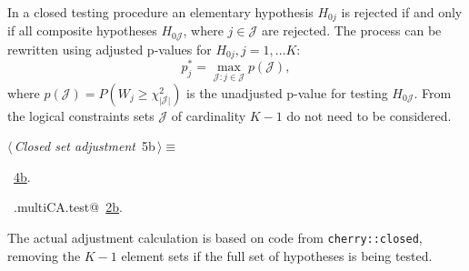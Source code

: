 \documentclass[reqno]{amsart}
\renewcommand{\NWtarget}[2]{\hypertarget{#1}{#2}}
\renewcommand{\NWlink}[2]{\hyperlink{#1}{#2}}
\newcommand{\setJ}{\mathcal{J}}
\begin{document}
In a closed testing procedure an elementary hypothesis $H_{0j}$ is rejected if and only if all composite hypotheses $H_{0\setJ}$, where $j\in \setJ$ are rejected. The process can be rewritten using adjusted p-values for $H_{0j}, j=1,\ldots K$:
\begin{equation}\label{E:adjustp}
    p^*_j = \max_{\setJ: j\in \setJ} p(\setJ),
\end{equation}
where $p(\setJ) = P(W_j \geq \chi^2_{|\setJ|})$ is the unadjusted p-value for testing $H_{0\setJ}$. From the logical constraints sets $\setJ$ of cardinality $K-1$ do not need to be considered.

\begin{flushleft} \small\label{scrap7}\raggedright\small
\NWtarget{nuweb5b}{} $\langle\,${\itshape Closed set adjustment}\nobreak\ {\footnotesize {5b}}$\,\rangle\equiv$
\vspace{-1ex}
\vspace{-1.5ex}
\footnotesize
\begin{list}{}{\setlength{\itemsep}{-\parsep}\setlength{\itemindent}{-\leftmargin}}
\item \NWtxtMacroRefIn\ \NWlink{nuweb4b}{4b}.
\item \NWtxtIdentsUsed\nobreak\  \verb@.multiCA.test@\nobreak\ \NWlink{nuweb2b}{2b}.
\item{}
\end{list}
\vspace{4ex}
\end{flushleft}
The actual adjustment calculation is based on code from \texttt{cherry::closed}, removing
the $K-1$ element sets if the full set of hypotheses is being tested.
\end{document}
